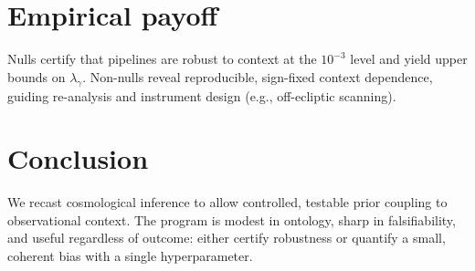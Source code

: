 \documentclass[11pt]{article}
\begin{document}
\section{Empirical payoff}
Nulls certify that pipelines are robust to context at the $10^{-3}$ level and yield upper bounds on $\lambda_\gamma$. Non-nulls reveal reproducible, sign-fixed context dependence, guiding re-analysis and instrument design (e.g., off-ecliptic scanning).

\section{Conclusion}
We recast cosmological inference to allow controlled, testable prior coupling to observational context. The program is modest in ontology, sharp in falsifiability, and useful regardless of outcome: either certify robustness or quantify a small, coherent bias with a single hyperparameter.
\end{document}
